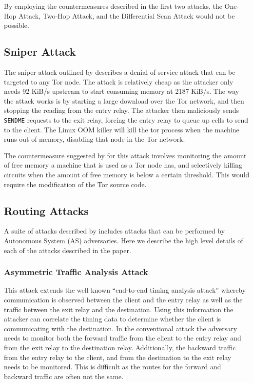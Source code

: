 \documentclass[9pt,technote]{IEEEtran}
\begin{document}
By employing the countermeasures described in the first two attacks, the One-Hop Attack, Two-Hop Attack, and the Differential Scan Attack would not be possible.\\

\subsection{Sniper Attack}
The sniper attack outlined by \citeauthor{jansen2014sniper} describes a denial
of service attack that can be targeted to any Tor node. The attack is relatively cheap as the attacker only needs 92 KiB/s upstream to start consuming memory at 2187 KiB/s. The way the attack works is by starting a large download over the Tor network, and then stopping the reading from the entry relay. The attacker then maliciously sends \texttt{SENDME} requests to the exit relay, forcing the entry relay to queue up cells to send to the client. The Linux OOM killer will kill the tor process when the machine runs out of memory, disabling that node in the Tor network.

The countermeasure suggested by \citeauthor{jansen2014sniper} for this attack involves monitoring the amount of free memory a machine that is used as a Tor node has, and selectively killing circuits when the amount of free memory is below a certain threshold. This would require the modification of the Tor source code.

\subsection{Routing Attacks}
A suite of attacks described by \citeauthor{sun2015raptor} includes attacks that can be performed by Autonomous System (AS) adversaries. Here we describe the high level details of each of the attacks described in the paper.

\subsubsection{Asymmetric Traffic Analysis Attack}
This attack extends the well known ``end-to-end timing analysis attack'' whereby communication is observed between the client and the entry relay as well as the traffic between the exit relay and the destination. Using this information the attacker can correlate the timing data to determine whether the client is communicating with the destination. In the conventional attack the adversary needs to monitor both the forward traffic from the client to the entry relay and from the exit relay to the destination relay. Additionally, the backward traffic from the entry relay to the client, and from the destination to the exit relay needs to be monitored. This is difficult as the routes for the forward and backward traffic are often not the same. 
\end{document}
